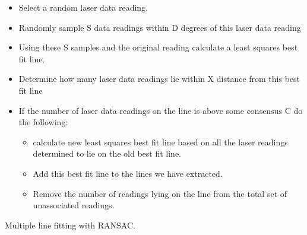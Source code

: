 \begin{algorithm}[H]
\begin{algorithmic}

	\begin{itemize}
	\item Select a random laser data reading. 
	\item Randomly sample S data readings within D degrees of this laser 
	data reading 
	\item Using these S samples and the original reading calculate a 
	least squares best fit line. 
	\item Determine how many laser data readings lie within X distance 
	from this best fit line
	\item If the number of laser data readings on the line is above some 
	consensus C do the following: 
		\begin{itemize}
			\item calculate new least squares best fit line based on all 
			the laser readings determined to lie on the old best fit 
			line. 
			\item Add this best fit line to the lines we have extracted. 
			\item Remove the number of readings lying on the line from the 
			total set of unassociated readings.
		\end{itemize}
	\end{itemize}
	\EndWhile
\end{algorithmic}
	\caption{Multiple line fitting with RANSAC.}
	\label{alg: RANSAC algorithm}
\end{algorithm}

